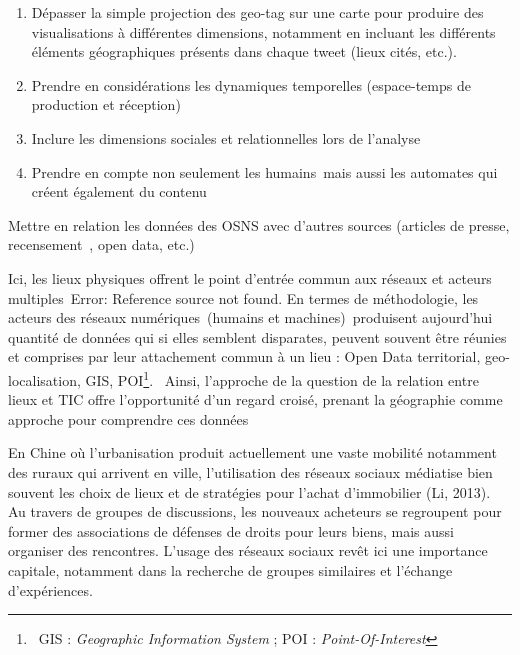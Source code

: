 \liststyleWWviiiNumi
\begin{enumerate}
\item {\sffamily\color{black}
D\'epasser la simple projection des geo-tag sur une carte pour produire des visualisations \`a diff\'erentes dimensions,
notamment en incluant les diff\'erents \'el\'ements g\'eographiques pr\'esents dans chaque tweet (lieux cit\'es,
etc.).}
\item {\sffamily\color{black}
Prendre en consid\'erations les dynamiques temporelles (espace-temps de production et r\'eception)}
\item {\sffamily\color{black}
Inclure les dimensions sociales et relationnelles lors de l'analyse}
\item {\sffamily\color{black}
Prendre en compte non seulement les humains~mais aussi les automates qui cr\'eent \'egalement du contenu}
\end{enumerate}
{\sffamily\color{black}
Mettre en relation les donn\'ees des OSNS avec d'autres sources (articles de presse, recensement~, open data, etc.)}


\bigskip

{\color{black}
Ici, les lieux physiques offrent le point d'entr\'ee commun aux r\'eseaux et acteurs multiples~Error: Reference source
not found. En termes de m\'ethodologie, les acteurs des r\'eseaux num\'eriques~(humains et machines)~produisent
aujourd'hui quantit\'e de donn\'ees qui si elles semblent disparates, peuvent souvent \^etre r\'eunies et comprises par
leur attachement commun \`a un lieu : Open Data territorial, geo-localisation, GIS,
POI\footnote{\foreignlanguage{english}{\ }\foreignlanguage{english}{GIS : }\foreignlanguage{english}{\textit{Geographic
Information System}}\foreignlanguage{english}{ ; POI : }\foreignlanguage{english}{\textit{Point-Of-Interest}}}.
\ Ainsi, l'approche de la question de la relation entre lieux et TIC offre l'opportunit\'e d'un regard crois\'e,
prenant la g\'eographie comme approche pour comprendre ces donn\'ees}


\bigskip

{\sffamily\color{black}
En Chine o\`u l'urbanisation produit actuellement une vaste mobilit\'e notamment des ruraux qui arrivent en ville,
l'utilisation des r\'eseaux sociaux m\'ediatise bien souvent les choix de lieux et de strat\'egies pour l'achat
d'immobilier (Li, 2013). Au travers de groupes de discussions, les nouveaux acheteurs se regroupent pour former des
associations de d\'efenses de droits pour leurs biens, mais aussi organiser des rencontres. L'usage des r\'eseaux
sociaux rev\^et ici une importance capitale, notamment dans la recherche de groupes similaires et l'\'echange
d'exp\'eriences.}


